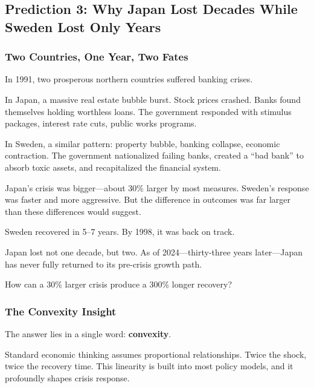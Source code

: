 \subsection{Prediction 3: Why Japan Lost Decades While Sweden Lost Only Years}
\label{subsec:pred3-asymmetric}


\subsubsection{Two Countries, One Year, Two Fates}

In 1991, two prosperous northern countries suffered banking crises.

In Japan, a massive real estate bubble burst. Stock prices crashed. Banks 
found themselves holding worthless loans. The government responded with 
stimulus packages, interest rate cuts, public works programs.

In Sweden, a similar pattern: property bubble, banking collapse, economic 
contraction. The government nationalized failing banks, created a ``bad bank'' 
to absorb toxic assets, and recapitalized the financial system.

Japan's crisis was bigger---about 30\% larger by most measures. Sweden's 
response was faster and more aggressive. But the difference in outcomes 
was far larger than these differences would suggest.

Sweden recovered in 5--7 years. By 1998, it was back on track.

Japan lost not one decade, but two. As of 2024---thirty-three years later---Japan 
has never fully returned to its pre-crisis growth path.

How can a 30\% larger crisis produce a 300\% longer recovery?

\subsubsection{The Convexity Insight}

The answer lies in a single word: \textbf{convexity}.

Standard economic thinking assumes proportional relationships. Twice the 
shock, twice the recovery time. This linearity is built into most policy 
models, and it profoundly shapes crisis response.

